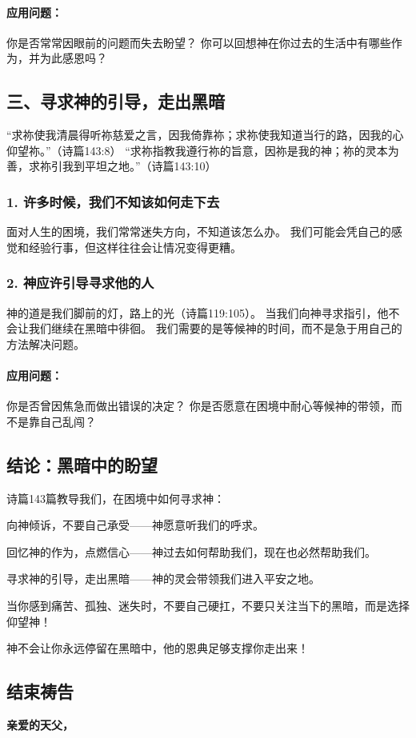 \documentclass[a4paper, 12pt]{article}
\begin{document}
\paragraph*{应用问题：}
你是否常常因眼前的问题而失去盼望？
你可以回想神在你过去的生活中有哪些作为，并为此感恩吗？
\subsection*{三、寻求神的引导，走出黑暗}
“求祢使我清晨得听祢慈爱之言，因我倚靠祢；求祢使我知道当行的路，因我的心仰望祢。”（诗篇143:8）
“求祢指教我遵行祢的旨意，因祢是我的神；祢的灵本为善，求祢引我到平坦之地。”（诗篇143:10）

\subsubsection*{1. 许多时候，我们不知该如何走下去}
面对人生的困境，我们常常迷失方向，不知道该怎么办。
我们可能会凭自己的感觉和经验行事，但这样往往会让情况变得更糟。
\subsubsection*{2. 神应许引导寻求他的人}
神的道是我们脚前的灯，路上的光（诗篇119:105）。
当我们向神寻求指引，他不会让我们继续在黑暗中徘徊。
我们需要的是等候神的时间，而不是急于用自己的方法解决问题。
\paragraph*{应用问题：}
你是否曾因焦急而做出错误的决定？
你是否愿意在困境中耐心等候神的带领，而不是靠自己乱闯？
\subsection*{结论：黑暗中的盼望}
诗篇143篇教导我们，在困境中如何寻求神：

向神倾诉，不要自己承受——神愿意听我们的呼求。

回忆神的作为，点燃信心——神过去如何帮助我们，现在也必然帮助我们。

寻求神的引导，走出黑暗——神的灵会带领我们进入平安之地。

当你感到痛苦、孤独、迷失时，不要自己硬扛，不要只关注当下的黑暗，而是选择仰望神！

神不会让你永远停留在黑暗中，他的恩典足够支撑你走出来！

\subsection*{结束祷告}
\textbf{亲爱的天父，}
\end{document}
